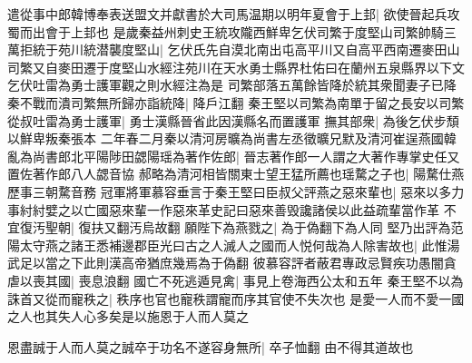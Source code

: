遣從事中郎韓博奉表送盟文并獻書於大司馬温期以明年夏會于上邽|{
	欲使晉起兵攻蜀而出會于上邽也}
是歲秦益州刺史王統攻隴西鮮卑乞伏司繁于度堅山司繁帥騎三萬拒統于苑川統潜襲度堅山|{
	乞伏氏先自漠北南出屯高平川又自高平西南遷麥田山司繁又自麥田遷于度堅山水經注苑川在天水勇士縣界杜佑曰在蘭州五泉縣界以下文乞伏吐雷為勇士護軍觀之則水經注為是}
司繁部落五萬餘皆降於統其衆聞妻子已降秦不戰而潰司繁無所歸亦詣統降|{
	降戶江翻}
秦王堅以司繁為南單于留之長安以司繁從叔吐雷為勇士護軍|{
	勇士漢縣晉省此因漢縣名而置護軍}
撫其部衆|{
	為後乞伏步頹以鮮卑叛秦張本}
二年春二月秦以清河房曠為尚書左丞徵曠兄默及清河崔逞燕國韓亂為尚書郎北平陽陟田勰陽瑶為著作佐郎|{
	晉志著作郎一人謂之大著作專掌史任又置佐著作郎八人勰音協}
郝略為清河相皆關東士望王猛所薦也瑶騖之子也|{
	陽騖仕燕歷事三朝騖音務}
冠軍將軍慕容垂言于秦王堅曰臣叔父評燕之惡來輩也|{
	惡來以多力事紂紂嬖之以亡國惡來輩一作惡來革史記曰惡來善毁讒諸侯以此益疏輩當作革}
不宜復汚聖朝|{
	復扶又翻汚烏故翻}
願陛下為燕戮之|{
	為于偽翻下為人同}
堅乃出評為范陽太守燕之諸王悉補邊郡臣光曰古之人滅人之國而人悦何哉為人除害故也|{
	此惟湯武足以當之下此則漢高帝猶庶幾焉為于偽翻}
彼慕容評者蔽君專政忌賢疾功愚闇貪虐以喪其國|{
	喪息浪翻}
國亡不死逃遁見禽|{
	事見上卷海西公太和五年}
秦王堅不以為誅首又從而寵秩之|{
	秩序也官也寵秩謂寵而序其官使不失次也}
是愛一人而不愛一國之人也其失人心多矣是以施恩于人而人莫之

恩盡誠于人而人莫之誠卒于功名不遂容身無所|{
	卒子恤翻}
由不得其道故也

